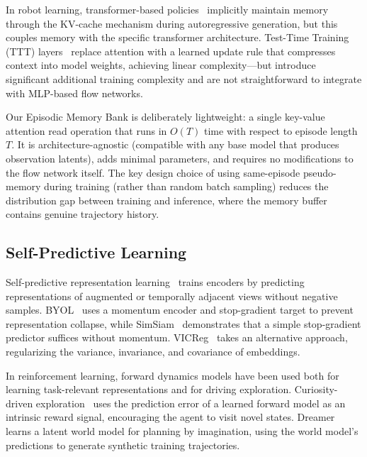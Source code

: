 In robot learning, transformer-based policies~\cite{zhao2023act,brohan2023rt2} implicitly maintain memory through the KV-cache mechanism during autoregressive generation, but this couples memory with the specific transformer architecture. Test-Time Training (TTT) layers~\cite{sun2024ttt} replace attention with a learned update rule that compresses context into model weights, achieving linear complexity---but introduce significant additional training complexity and are not straightforward to integrate with MLP-based flow networks.

Our Episodic Memory Bank is deliberately lightweight: a single key-value attention read operation that runs in $O(T)$ time with respect to episode length $T$. It is architecture-agnostic (compatible with any base model that produces observation latents), adds minimal parameters, and requires no modifications to the flow network itself. The key design choice of using same-episode pseudo-memory during training (rather than random batch sampling) reduces the distribution gap between training and inference, where the memory buffer contains genuine trajectory history.

\subsection{Self-Predictive Learning}

Self-predictive representation learning~\cite{grill2020bootstrap,bardes2022vicreg,chen2021exploring} trains encoders by predicting representations of augmented or temporally adjacent views without negative samples. BYOL~\cite{grill2020bootstrap} uses a momentum encoder and stop-gradient target to prevent representation collapse, while SimSiam~\cite{chen2021exploring} demonstrates that a simple stop-gradient predictor suffices without momentum. VICReg~\cite{bardes2022vicreg} takes an alternative approach, regularizing the variance, invariance, and covariance of embeddings.

In reinforcement learning, forward dynamics models have been used both for learning task-relevant representations and for driving exploration. Curiosity-driven exploration~\cite{pathak2017curiosity} uses the prediction error of a learned forward model as an intrinsic reward signal, encouraging the agent to visit novel states. Dreamer~\cite{hafner2020dream} learns a latent world model for planning by imagination, using the world model's predictions to generate synthetic training trajectories.

